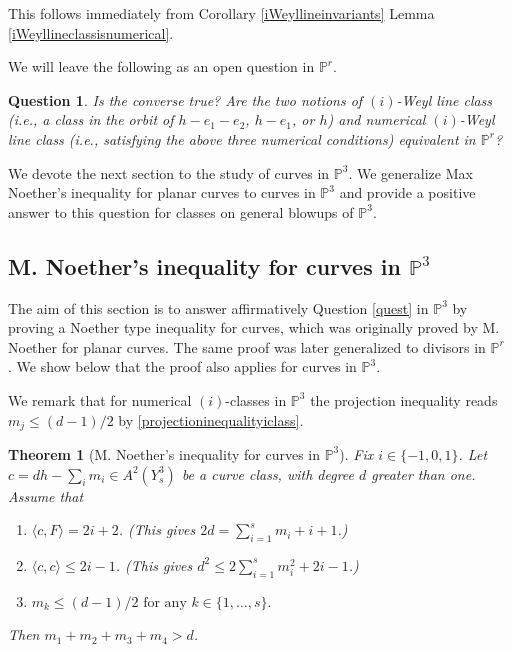 \documentclass[12pt]{article}
\numberwithin{equation}{section}
\newtheorem{theorem}[equation]{Theorem}
\newtheorem{question}[equation]{Question}
\numberwithin{equation}{section}
\numberwithin{subeq}{equation}
\def\bbP{\mathbb{P}}
\begin{document}
This follows immediately from Corollary \ref{iWeyllineinvariants}
Lemma \ref{iWeyllineclassisnumerical}.

We will leave the following as an open question in $\bbP^r$. 
\begin{question}\label{quest}
Is the converse true?
Are the two notions of $(i)$-Weyl line class
(i.e., a class in the orbit of $h-e_1-e_2$, $h-e_1$, or $h$) 
and numerical $(i)$-Weyl line class
(i.e., satisfying the above three numerical conditions)
equivalent in $\bbP^r$?
\end{question}

We devote the next section to the study of curves in $\bbP^3$.
We generalize Max Noether's inequality for planar curves
to curves in $\bbP^3$
and provide a positive answer to this question 
for classes on general blowups of $\mathbb{P}^3$.

	
\subsection{M. Noether's inequality for curves in $\mathbb{P}^3$}\label{noether section}
The aim of this section is to answer affirmatively Question \eqref{quest} in $\bbP^3$
by proving a Noether type inequality for curves,
which was originally proved by M. Noether for planar curves.
The same proof was later generalized to divisors in $\bbP^r$ \cite{DO, DP}.
We show below that the proof also applies for curves in $\bbP^3$.

We remark that for numerical $(i)$-classes in $\bbP^3$
the projection inequality reads $m_j\leq (d-1)/2$
by \eqref{projectioninequalityiclass}.

\begin{theorem}[M. Noether's inequality for curves in $\bbP^3$] \label{noether}
Fix $i \in \{-1,0,1\}$.
Let $c = dh-\sum_i m_i \in A^{2}(Y^3_{s})$ be a curve class,
with degree $d$ greater than one.
Assume that 
\begin{enumerate}
  	\item 	$\langle c, F \rangle = 2i+2$. (This gives $2d=\sum_{i=1}^s m_i + i + 1$.)
  	\item	$\langle c, c \rangle \leq 2i-1$. (This gives $d^2 \leq 2\sum_{i=1}^s m_i^2 +2i-1$.)
  	\item	$m_k \leq (d-1)/2 \text{ for any }  k\in \{1, \ldots, s\}.$
 \end{enumerate}
Then $m_1+m_2+m_3+m_4 > d$.
\end{theorem}
\end{document}

